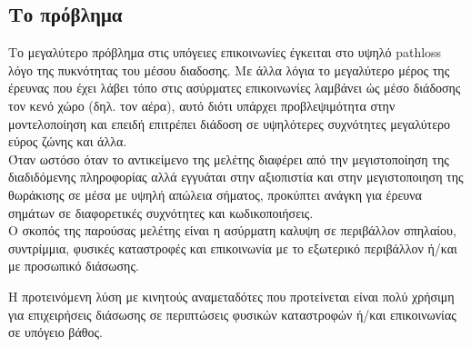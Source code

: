     \subsection{\textsf{Το πρόβλημα}} 
        Το μεγαλύτερο πρόβλημα στις υπόγειες
        επικοινωνίες έγκειται στο υψηλό pathloss λόγο της πυκνότητας του μέσου διαδοσης. Με
        άλλα λόγια το μεγαλύτερο μέρος της έρευνας που έχει λάβει τόπο στις ασύρματες
        επικοινωνίες λαμβάνει ώς μέσο διάδοσης τον κενό χώρο (δηλ. τον αέρα), αυτό διότι
        υπάρχει προβλεψιμότητα στην μοντελοποίηση και επειδή επιτρέπει διάδοση σε
        υψηλότερες συχνότητες μεγαλύτερο εύρος ζώνης και άλλα.\\
        Όταν ωστόσο όταν το αντικείμενο της μελέτης διαφέρει από την μεγιστοποίηση της
        διαδιδόμενης πληροφορίας αλλά εγγυάται στην αξιοπιστία και στην μεγιστοποιηση της
        θωράκισης σε μέσα με υψηλή απώλεια σήματος, προκύπτει ανάγκη για έρευνα σημάτων σε
        διαφορετικές συχνότητες και κωδικοποιήσεις.\\
        Ο σκοπός της παρούσας μελέτης είναι η ασύρματη καλυψη σε περιβάλλον σπηλαίου, συντρίμμια,
        φυσικές καταστροφές και επικοινωνία με το εξωτερικό περιβάλλον ή/και με προσωπικό
        διάσωσης.

        Η προτεινόμενη λύση με κινητούς αναμεταδότες που προτείνεται είναι πολύ χρήσιμη
        για επιχειρήσεις διάσωσης σε περιπτώσεις φυσικών καταστροφών ή/και επικοινωνίας σε
        υπόγειο βάθος.
